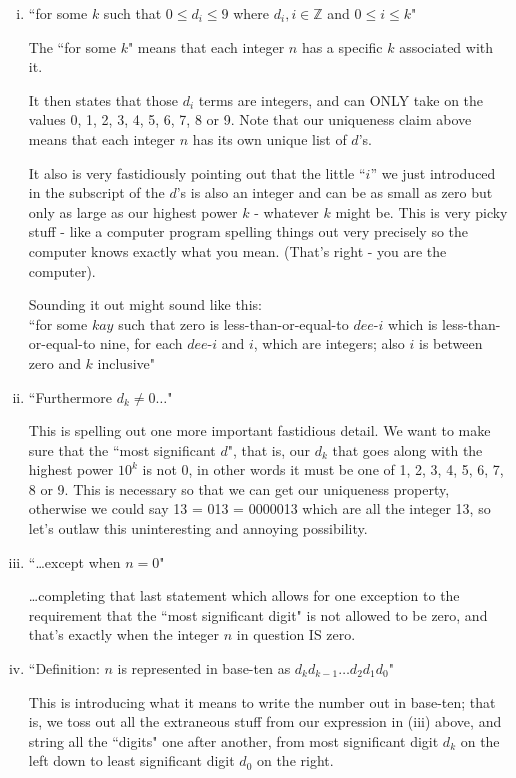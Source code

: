 \documentclass{article}
\begin{document}
\begin{enumerate}[i)]
\item ``for some $k$ such that $0 \le d_i \le 9$ where $d_i,i\in\mathbb{Z}$ and $0 \le i \le k$"

The ``for some $k$" means that each integer $n$ has a specific $k$ associated with it.

It then states that those $d_i$ terms are integers,
and can ONLY take on the values 0, 1, 2, 3, 4, 5, 6, 7, 8 or 9.
Note that our uniqueness claim above means that each
integer $n$ has its own unique list of $d$'s.

It also is very fastidiously pointing out that the little ``$i$'' we just introduced
in the subscript of the $d$'s is also an integer and can be as small as zero but
only as large as our highest power $k$ - whatever $k$ might be.
This is very picky stuff - like a computer program spelling things out
very precisely so the computer knows exactly what you mean.
(That's right - you are the computer).

Sounding it out might sound like this:\\
``for some $kay$ such that zero is less-than-or-equal-to $dee$-$i$
which is less-than-or-equal-to nine, for each $dee$-$i$ and $i$,
which are integers; also $i$ is between zero and $k$ inclusive"

\filbreak
\item ``Furthermore $d_k\ne0\dots{}$"

This is spelling out one more important fastidious detail.
We want to make sure that the ``most significant $d$", that is,
our $d_k$ that goes along with the highest power $10^k$ is not 0,
in other words it must be one of 1, 2, 3, 4, 5, 6, 7, 8 or 9.
This is necessary so that we can get our uniqueness property,
otherwise we could say 13 = 013 = 0000013 which are all the integer 13,
so let's outlaw this uninteresting and annoying possibility.

\item ``\dots{}except when $n=0$"

\dots{}completing that last statement which allows for
one exception to the requirement that the ``most significant digit"
is not allowed to be zero, and that's exactly when the
integer $n$ in question IS zero.

\item ``Definition: $n$ is represented in base-ten as $d_kd_{k-1}\dots{}d_2d_1d_0$"

This is introducing what it means to write the number out in base-ten; that is,
we toss out all the extraneous stuff from our expression in (iii) above,
and string all the ``digits" one after another,
from most significant digit $d_k$ on the left down to least
significant digit $d_0$ on the right.
\end{enumerate}
\end{document}

